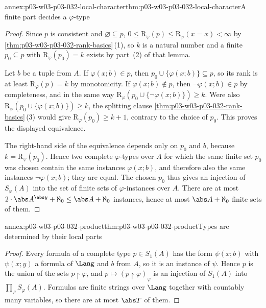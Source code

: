 \begin{annexitem}{annex:p03-w03-p03-032-local-character}{thm:p03-w03-p03-032-local-character}{A finite part decides a \(\varphi\)-type}
\begin{proof}
Since \(p\) is consistent and \(\varnothing\subseteq p\),
\(0\leq\mathrm R_\varphi(p)\leq\mathrm R_\varphi(x=x)<\infty\) by
\cref{thm:p03-w03-p03-032-rank-basics}\,(1), so \(k\) is a natural number
and a finite \(p_0\subseteq p\) with \(\mathrm R_\varphi(p_0)=k\) exists by
part~(2) of that lemma.

Let \(b\) be a tuple from \(A\).  If \(\varphi(x;b)\in p\), then
\(p_0\cup\{\varphi(x;b)\}\subseteq p\), so its rank is at least
\(\mathrm R_\varphi(p)=k\) by monotonicity.  If \(\varphi(x;b)\notin p\),
then \(\neg\varphi(x;b)\in p\) by completeness, and in the same way
\(\mathrm R_\varphi(p_0\cup\{\neg\varphi(x;b)\})\geq k\).  Were also
\(\mathrm R_\varphi(p_0\cup\{\varphi(x;b)\})\geq k\), the splitting clause
\cref{thm:p03-w03-p03-032-rank-basics}\,(3) would give
\(\mathrm R_\varphi(p_0)\geq k+1\), contrary to the choice of \(p_0\).  This
proves the displayed equivalence.

The right-hand side of the equivalence depends only on \(p_0\) and \(b\),
because \(k=\mathrm R_\varphi(p_0)\).  Hence two complete \(\varphi\)-types
over \(A\) for which the same finite set \(p_0\) was chosen contain the same
instances \(\varphi(x;b)\), and therefore also the same instances
\(\neg\varphi(x;b)\); they are equal.  The chosen \(p_0\) thus gives an
injection of \(S_\varphi(A)\) into the set of finite sets of
\(\varphi\)-instances over \(A\).  There are at most
\(2\cdot\abs A^{\abs y}+\aleph_0\leq\abs A+\aleph_0\) instances, hence at most
\(\abs A+\aleph_0\) finite sets of them.
\end{proof}
\end{annexitem}

\begin{annexitem}{annex:p03-w03-p03-032-product}{thm:p03-w03-p03-032-product}{Types are determined by their local parts}
\begin{proof}
Every formula of a complete type \(p\in S_1(A)\) has the form
\(\psi(x;b)\) with \(\psi(x;y)\) a formula of \(\Lang\) and \(b\) from
\(A\), so it is an instance of \(\psi\).  Hence \(p\) is the union of the
sets \(p\mathbin{\upharpoonright}\varphi\), and
\(p\mapsto(p\mathbin{\upharpoonright}\varphi)_\varphi\) is an injection of
\(S_1(A)\) into \(\prod_\varphi S_\varphi(A)\).  Formulas are finite strings
over \(\Lang\) together with countably many variables, so there are at most
\(\abs T\) of them.
\end{proof}
\end{annexitem}

